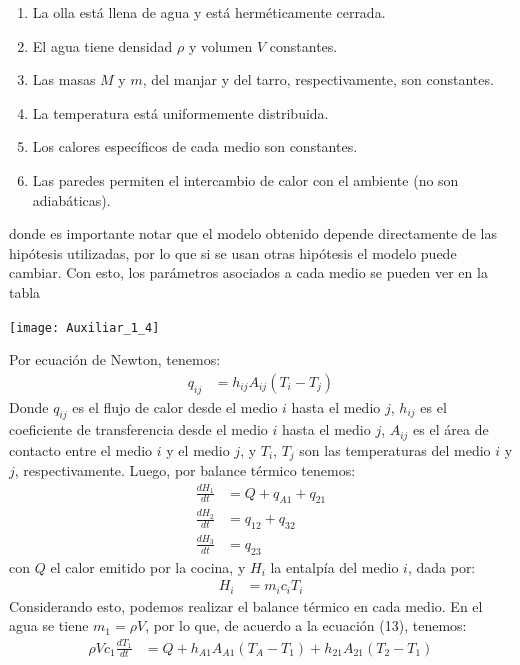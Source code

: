 \documentclass[
  11pt,
  letterpaper,
   addpoints,
   answers
  ]{exam}
\begin{document}
\begin{questions}
\begin{solution}
\begin{enumerate}
    \item La olla está llena de agua y está herméticamente cerrada.
    \item El agua tiene densidad $\rho$ y volumen $V$ constantes.
    \item Las masas $M$ y $m$, del manjar y del tarro, respectivamente, son constantes.
    \item La temperatura está uniformemente distribuida.
    \item Los calores específicos de cada medio son constantes.
    \item Las paredes permiten el intercambio de calor con el ambiente (no son adiabáticas).
\end{enumerate}

donde es importante notar que el modelo obtenido depende directamente de las hipótesis utilizadas, por lo que si se usan otras hipótesis el modelo puede cambiar. Con esto, los parámetros asociados a cada medio se pueden ver en la tabla
\begin{center}
    \texttt{[image: Auxiliar\_1\_4]}
  \end{center}
Por ecuación de Newton, tenemos:
\begin{align}
    q_{ij} &= h_{ij}A_{ij} (T_i - T_j)
    \end{align}    
Donde $q_{ij}$ es el flujo de calor desde el medio $i$ hasta el medio $j$, $h_{ij}$ es el coeficiente de transferencia desde el medio $i$ hasta el medio $j$, $A_{ij}$ es el área de contacto entre el medio $i$ y el medio $j$, y $T_i$, $T_j$ son las temperaturas del medio $i$ y $j$, respectivamente.
Luego, por balance térmico tenemos:
\begin{align}
    \frac{dH_1}{dt} &= Q + q_{A1} + q_{21} \tag{13} \\
    \frac{dH_2}{dt} &= q_{12} + q_{32} \tag{14} \\
    \frac{dH_3}{dt} &= q_{23} \tag{15}
    \end{align}    
con $Q$ el calor emitido por la cocina, y $H_i$ la entalpía del medio $i$, dada por:
\begin{align}
    H_i &= m_i c_i T_i \tag{17}
    \end{align}
Considerando esto, podemos realizar el balance térmico en cada medio. En el agua se tiene $m_1 = \rho V$, por lo que, de acuerdo a la ecuación (13), tenemos:
\begin{align}
    \rho V c_1 \frac{dT_1}{dt} &= Q + h_{A1}A_{A1} (T_A - T_1) + h_{21}A_{21} (T_2 - T_1) \tag{18} \\

\end{align}
\end{solution}
\end{questions}
\end{document}
